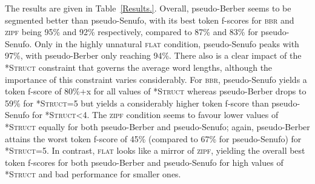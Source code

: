\documentclass[11pt]{article}
\begin{document}
The results are given in Table~\ref{Results.}. Overall, pseudo-Berber seems to be segmented better than pseudo-Senufo, with its best token f-scores for \textsc{bbr} and \textsc{zipf} being 95\% and 92\% respectively, compared to 87\% and 83\% for pseudo-Senufo. Only in the highly unnatural \textsc{flat} condition, pseudo-Senufo peaks with 97\%, with pseudo-Berber only reaching 94\%. There also is a clear impact of the \textsc{*Struct} constraint that governs the average word lengths, although the importance of this constraint varies considerably. For \textsc{bbr}, pseudo-Senufo yields a token f-score of 80\%+x for all values of \textsc{*Struct} whereas pseudo-Berber drops to 59\% for \textsc{*Struct}=5 but yields a considerably higher token f-score than pseudo-Senufo for \textsc{*Struct}<4. The \textsc{zipf} condition seems to favour lower values of \textsc{*Struct} equally for both pseudo-Berber and pseudo-Senufo; again, pseudo-Berber attains the worst token f-score of 45\% (compared to 67\% for pseudo-Senufo) for \textsc{*Struct}=5. In contrast, \textsc{flat} looks like a mirror of \textsc{zipf}, yielding the overall best token f-scores for both pseudo-Berber and pseudo-Senufo for high values of \textsc{*Struct} and bad performance for smaller ones.

\end{document}
